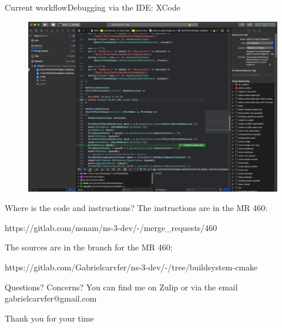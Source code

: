 \documentclass[12pt]{beamer}
\begin{document}
\begin{frame}{Current workflow}{Debugging via the IDE: XCode}
    \begin{figure}[h]
        \hspace{-3em}
        \includegraphics[width=0.95\linewidth]{debug_xcode.png}
    \end{figure}
\end{frame}  

\begin{frame}{Where is the code and instructions?}
    The instructions are in the MR 460:
    
    {\footnotesize https://gitlab.com/nsnam/ns-3-dev/-/merge\_requests/460}

    \vspace{1em}
    The sources are in the branch for the MR 460:
    
    {\footnotesize https://gitlab.com/Gabrielcarvfer/ns-3-dev/-/tree/buildsystem-cmake}
    
    \vspace{1em}
\end{frame} 

\begin{frame}{Questions? Concerns?}
    \centering
    You can find me on Zulip or via the email gabrielcarvfer@gmail.com

\end{frame}

\begin{frame}{}
    \centering Thank you for your time
    
\end{frame} 
\end{document}
